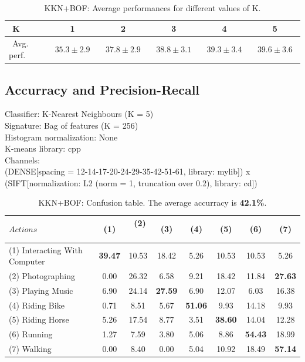 \documentclass[10pt,a4paper]{llncs}
\begin{document}
\begin{table}[H]
\centering
\caption{KKN+BOF: Average performances for different values of K.}
\label{table:KNN_BOF:Classifier}
\begin{tabular}{|l|c|c|c|c|c|}
\hline
$~~$K & 1 & 2 & 3 & 4 & 5 \\ \hline
$~~$Avg. perf.$~~$ & $~~35.3 \pm 2.9~~$ & $~~37.8 \pm 2.9~~$ & $~~38.8 \pm 3.1~~$ & $~~39.3 \pm 3.4~~$ & $~~\mathbf{39.6 \pm 3.6}~~$ \\ \hline
\end{tabular}
\end{table}

\subsection{Accurracy and Precision-Recall}

Classifier: K-Nearest Neighbours (K = 5)\\
Signature: Bag of features (K = 256)\\
Histogram normalization: None\\
K-means library: cpp\\
Channels:\\
(DENSE[spacing = 12-14-17-20-24-29-35-42-51-61, library: mylib]) x (SIFT[normalization: L2 (norm = 1, truncation over 0.2), library: cd])\\

\begin{table}[H]
\centering
\caption{KKN+BOF: Confusion table. The average accurracy is \textbf{42.1\%}.}
\label{table:KNN_BOF:Accuracy}
\begin{tabular}{|l|c|c|c|c|c|c|c|}
\hline
$Actions $ & $~~$(1)$~~$ & $~~$(2)$~~$ & $~~$(3)$~~$ & $~~$(4)$~~$ & $~~$(5)$~~$ & $~~$(6)$~~$ & $~~$(7)$~~$\\ \hline
(1) Interacting With Computer & \cellcolor{lightgray}\textbf{39.47} & 10.53 & 18.42 & 5.26 & 10.53 & 10.53 & 5.26 \\ \hline
(2) Photographing             & 0.00 & 26.32 & 6.58 & 9.21 & 18.42 & 11.84 & \cellcolor{lightgray}\textbf{27.63} \\ \hline
(3) Playing Music             & 6.90 & 24.14 & \cellcolor{lightgray}\textbf{27.59} & 6.90 & 12.07 & 6.03 & 16.38 \\ \hline
(4) Riding Bike               & 0.71 & 8.51 & 5.67 & \cellcolor{lightgray}\textbf{51.06} & 9.93 & 14.18 & 9.93 \\ \hline
(5) Riding Horse              & 5.26 & 17.54 & 8.77 & 3.51 & \cellcolor{lightgray}\textbf{38.60} & 14.04 & 12.28 \\ \hline
(6) Running                   & 1.27 & 7.59 & 3.80 & 5.06 & 8.86 & \cellcolor{lightgray}\textbf{54.43} & 18.99 \\ \hline
(7) Walking                   & 0.00 & 8.40 & 0.00 & 5.04 & 10.92 & 18.49 & \cellcolor{lightgray}\textbf{57.14} \\ \hline
\end{tabular}
\end{table}
\end{document}
